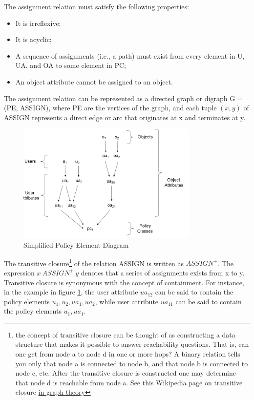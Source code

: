 \documentclass[12pt,a4paper,titlepage]{book}
\begin{document}
	The assignment relation must satisfy the following properties:
	
	\begin{itemize}
	
		\item It is irreflexive;
		
		\item It is acyclic;
		
		\item A sequence of assignments (i.e., a path) must exist from every element in U, UA, and OA to some element in PC;
		
		\item An object attribute cannot be assigned to an object.
	
	\end{itemize}

	The assignment relation can be represented as a directed graph or digraph G = (PE, ASSIGN),
	where PE are the vertices of the graph, and each tuple $(x, y)$ of ASSIGN represents a direct edge or arc that originates at x and terminates at y.
	
	\begin{figure}[h]
		\centering
		\includegraphics[width = 0.8\textwidth]{images/simplified_PE_diagram.png}
		\caption{Simplified Policy Element Diagram}
		\label{fig:simplifiedPEdiagram}
	\end{figure}
	
	The transitive closure\footnote{the concept of transitive closure can be thought of as constructing a data structure that makes it possible to answer reachability questions. That is, can one get from node a to node d in one or more hops? A binary relation tells you only that node a is connected to node b, and that node b is connected to node c, etc. After the transitive closure is constructed one may determine that node d is reachable from node a. See this Wikipedia page on transitive closure  \href{https://en.wikipedia.org/wiki/Transitive\_closure\#In\_graph\_theory}{in graph theory}} of the relation ASSIGN is written as $ASSIGN^+$. The expression $x \ 
	ASSIGN^+ \ y$ denotes that a series of assignments exists from x to y. Transitive closure is synonymous with the concept of containment. For instance, in the example in figure  \ref{fig:simplifiedPEdiagram}, the user attribute $ ua_{12} $ can be said to contain the policy elements $ u_1, u_2, ua_1, ua_2 $, while user attribute $ ua_{11} $ can be said to contain the policy elements $ u_1, ua_1 $.
	
\end{document}
